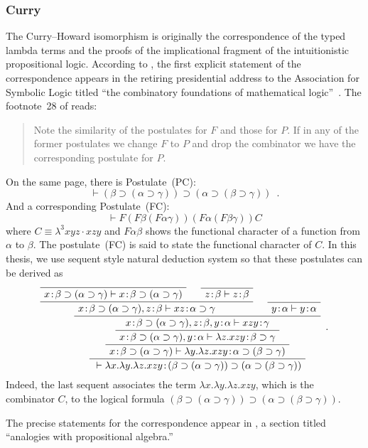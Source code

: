 \subsubsection{Curry}
The Curry--Howard isomorphism is originally the correspondence of
the typed lambda terms and the proofs of the implicational fragment of
the intuitionistic propositional logic.
According to \citep{curryhoward}, the first explicit statement of the
correspondence appears
in the retiring presidential address to the Association for Symbolic
Logic titled ``the combinatory foundations of mathematical
logic''~\cite{curry1942}.
The footnote~28 of \citep{curry1942} reads:
 \begin{quote}
  Note the similarity of the postulates for $F$ and those for $P$.  If
  in any of the former postulates we change $F$ to $P$ and drop the
  combinator we have the corresponding postulate for $P$.
 \end{quote}
 On the same page, there is Postulate~(PC):
\[
 \vdash (\beta\supset (\alpha\supset \gamma))\supset (\alpha \supset
 (\beta\supset \gamma))\enspace.
\]
And a corresponding Postulate~(FC):
\[
 \vdash F(F\beta(F\alpha\gamma))(F\alpha(F\beta\gamma))C
\]
 where $C\equiv \lambda^3 xyz\cdot xzy$ and $F\alpha\beta$ shows the
 functional character of a
 function from $\alpha$ to $\beta$.  The postulate~(FC) is said to
 state the functional character of $C$.
 In this thesis, we use sequent style natural deduction system so that these
 postulates can be derived as
 \[
 \AxiomC{}
 \useq{\tj{x}{\beta\supset (\alpha\supset \gamma)}}{\tj{x}{\beta\supset
 (\alpha\supset \gamma)}}
 \AxiomC{}
 \useq{\tj{z}{\beta}}{\tj{z}{\beta}}
 \bseq{\tj{x}{\beta\supset (\alpha\supset \gamma)},
 \tj{z}{\beta}}{\tj{xz}{\alpha\supset\gamma}}
 \AxiomC{}
 \useq{\tj{y}{\alpha}}{\tj{y}{\alpha}}
 \bseq{\tj{x}{\beta\supset (\alpha\supset \gamma)},
 \tj{z}{\beta},\tj{y}{\alpha}}{\tj{xzy}{\gamma}}
 \useq{\tj{x}{\beta\supset (\alpha\supset
 \gamma)},\tj{y}{\alpha}}{\tj{\lambda z. xzy}{\beta\supset\gamma}}
 \useq{\tj{x}{\beta\supset (\alpha\supset
 \gamma)}}{\tj{\lambda y.\lambda z. xzy}{\alpha\supset(\beta\supset\gamma)}}
 \useq{}{\tj{\lambda x.\lambda y.\lambda z. xzy}{{(\beta\supset (\alpha\supset
 \gamma))}\supset (\alpha\supset(\beta\supset\gamma))}}
 \DisplayProof \enspace .
 \]
 Indeed, the last sequent associates the term $\lambda x.\lambda
 y.\lambda z. xzy$, which is the combinator $C$, to the logical formula
 $(\beta\supset (\alpha\supset
 \gamma))\supset (\alpha\supset(\beta\supset\gamma))$.

The
precise statements for the correspondence appear in
\citet[9E]{curry1974combinatory}, a section titled ``analogies with
propositional algebra.''

